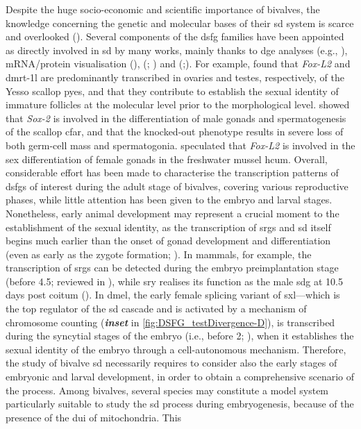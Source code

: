 Despite the huge socio-economic and scientific importance of bivalves, the knowledge concerning the genetic and molecular bases of their \gls{sd} system is scarce and overlooked (). Several components of the \gls{dsfg} families have been appointed as directly involved in \gls{sd} by many works, mainly thanks to \gls{dge} analyses (e.g., ), mRNA/protein visualisation (),  (; ) and  (;). For example,  found that \textit{Fox-L2} and \gls{dmrt-1l} are predominantly transcribed in ovaries and testes, respectively, of the Yesso scallop \gls{pyes}, and that they contribute to establish the sexual identity of immature follicles at the molecular level prior to the morphological level.  showed that \textit{Sox-2} is involved in the differentiation of male gonads and spermatogenesis of the scallop \gls{cfar}, and that the knocked-out phenotype results in severe loss of both germ-cell mass and spermatogonia.  speculated that \textit{Fox-L2} is involved in the sex differentiation of female gonads in the freshwater mussel \gls{hcum}. Overall, considerable effort has been made to characterise the transcription patterns of \glspl{dsfg} of interest during the adult stage of bivalves, covering various reproductive phases, while little attention has been given to the embryo and larval stages. Nonetheless, early animal development may represent a crucial moment to the establishment of the sexual identity, as the transcription of \glspl{srg} and \gls{sd} itself begins much earlier than the onset of gonad development and differentiation (even as early as the zygote formation; ). In mammals, for example, the transcription of \glspl{srg} can be detected during the embryo preimplantation stage (before \qty{4.5}{\dpf}; reviewed in ), while \gls{sry} realises its function as the male \gls{sdg} at 10.5 days post coitum (). In \gls{dmel}, the early female splicing variant of \gls{sxl}---which is the top regulator of the \gls{sd} cascade and is activated by a mechanism of chromosome counting (\textbf{\textit{inset}} in \cref{fig:DSFG_testDivergence-D}), is transcribed during the syncytial stages of the embryo (i.e., before \qty{2}{\hpf}; ), when it establishes the sexual identity of the embryo through a cell-autonomous mechanism. Therefore, the study of bivalve \gls{sd} necessarily requires to consider also the early stages of embryonic and larval development, in order to obtain a comprehensive scenario of the process. Among bivalves, several species may constitute a model system particularly suitable to study the \gls{sd} process during embryogenesis, because of the presence of the \gls{dui} of mitochondria. This 
